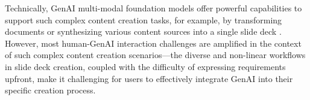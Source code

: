 Technically, GenAI multi-modal foundation models offer powerful capabilities to support such complex content creation tasks, for example, by transforming documents or synthesizing various content sources into a single slide deck \cite{costa_smartedu_2023, Fu2022DOC2PPT, winters_automatically_2019a}. 
However, most human-GenAI interaction challenges are amplified in the context of such complex content creation scenarios---the diverse and non-linear workflows in slide deck creation, coupled with the difficulty of expressing requirements upfront, make it challenging for users to effectively integrate GenAI into their specific creation process.



